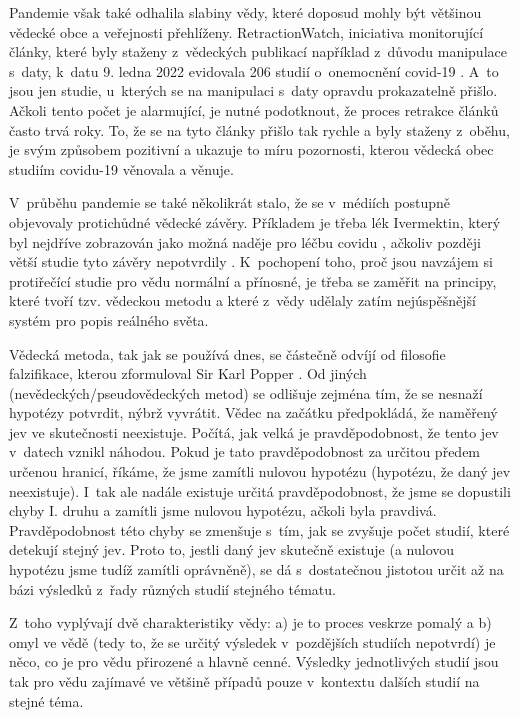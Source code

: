 Pandemie však také odhalila slabiny vědy, které doposud mohly být většinou vědecké obce a veřejnosti přehlíženy. RetractionWatch, iniciativa monitorující články, které byly staženy z~vědeckých publikací například z~důvodu manipulace s~daty, k~datu 9. ledna 2022 evidovala 206 studií o~onemocnění covid-19 \cite{RetractionWatch}. A~to jsou jen studie, u~kterých se na manipulaci s~daty opravdu prokazatelně přišlo. Ačkoli tento počet je alarmující, je nutné podotknout, že proces retrakce článků často trvá roky. To, že se na tyto články přišlo tak rychle a byly staženy z~oběhu, je svým způsobem pozitivní a ukazuje to míru pozornosti, kterou vědecká obec studiím covidu-19 věnovala a věnuje.

V~průběhu pandemie se také několikrát stalo, že se v~médiích postupně objevovaly protichůdné vědecké závěry. Příkladem je třeba lék Ivermektin, který byl nejdříve zobrazován jako možná naděje pro léčbu covidu \cite{Ceskatelevize2020}, ačkoliv později větší studie tyto závěry nepotvrdily \cite{Lopez-Medina2021}. K~pochopení toho, proč jsou navzájem si protiřečící studie pro vědu normální a přínosné, je třeba se zaměřit na principy, které tvoří tzv. vědeckou metodu a které z~vědy udělaly zatím nejúspěšnější systém pro popis reálného světa.

Vědecká metoda, tak jak se používá dnes, se částečně odvíjí od filosofie falzifikace, kterou zformuloval Sir Karl Popper \cite{Popper2002}. Od jiných (ne\-vě\-de\-ckých/pseu\-do\-vě\-de\-ckých metod) se odlišuje zejména tím, že se nesnaží hypotézy potvrdit, nýbrž vyvrátit. Vědec na začátku předpokládá, že naměřený jev ve skutečnosti neexistuje. Počítá, jak velká je pravděpodobnost, že tento jev v~datech vznikl náhodou. Pokud je tato pravděpodobnost za určitou předem určenou hranicí, říkáme, že jsme zamítli nulovou hypotézu (hypotézu, že daný jev neexistuje). I~tak ale nadále existuje určitá pravděpodobnost, že jsme se dopustili chyby I. druhu a zamítli jsme nulovou hypotézu, ačkoli byla pravdivá. Pravděpodobnost této chyby se zmenšuje s~tím, jak se zvyšuje počet studií, které detekují stejný jev. Proto to, jestli daný jev skutečně existuje (a nulovou hypotézu jsme tudíž zamítli oprávněně), se dá s~dostatečnou jistotou určit až na bázi výsledků z~řady různých studií stejného tématu.

Z~toho vyplývají dvě charakteristiky vědy: a) je to proces veskrze pomalý a b) omyl ve vědě (tedy to, že se určitý výsledek v~pozdějších studiích nepotvrdí) je něco, co je pro vědu přirozené a hlavně cenné. Výsledky jednotlivých studií jsou tak pro vědu zajímavé ve většině případů pouze v~kontextu dalších studií na stejné téma.

